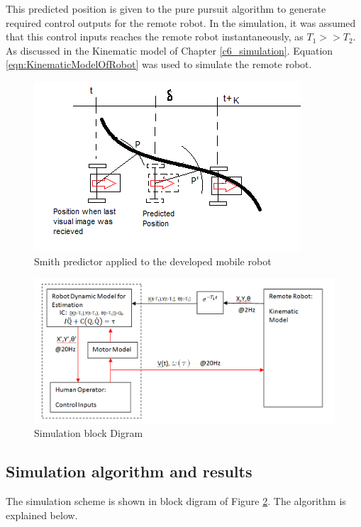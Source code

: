 This predicted position is given to the pure pursuit algorithm to generate required control outputs for the remote robot. In the simulation, it was assumed that this control inputs reaches the remote robot instantaneously, as $T_1>> T_2$. As discussed in the   Kinematic model of Chapter \ref{c6_simulation}. Equation \ref{eqn:KinematicModelOfRobot} was used to simulate the remote robot.
 \begin{figure}
	\includegraphics[width=1.2\linewidth]{Chapter7/fig/robotPredictPos}
	\caption{Smith predictor applied to the developed mobile robot}
	\label{fig:SmithRobot}
\end{figure}
 \begin{figure}
	\includegraphics[width=\linewidth]{Chapter7/fig/Sumilation_BlkDgm}
	\caption{Simulation block Digram}
	\label{fig:SimBlock}
\end{figure}
\subsection{Simulation algorithm and  results} 
The simulation scheme is  shown in block digram of Figure \ref{fig:SimBlock}. The algorithm  is explained  below.

